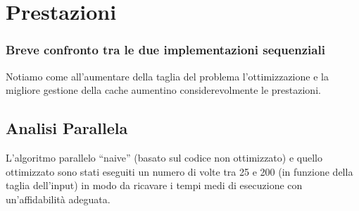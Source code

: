 \documentclass[12pt,a4paper,oneside,openright]{article}
\begin{document}
\section{Prestazioni}




\subsubsection*{Breve confronto tra le due implementazioni sequenziali}
Notiamo come all'aumentare della taglia del problema l'ottimizzazione e la migliore gestione della cache aumentino considerevolmente le prestazioni.
\begin{figure}[H]
  \centering 
  \quad   {}   
\end{figure}

\subsection{Analisi Parallela}
L'algoritmo parallelo ``naive'' (basato sul codice non ottimizzato) e quello ottimizzato sono stati eseguiti un numero di volte tra 25 e 200 (in funzione della taglia dell'input) in modo da ricavare i tempi medi di esecuzione con un'affidabilità adeguata.
\end{document}
